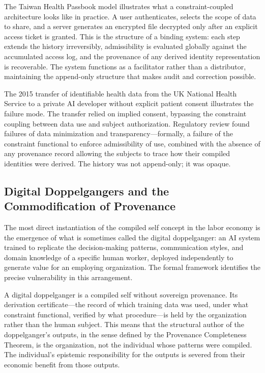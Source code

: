 \documentclass[12pt, a4paper]{article}
\theoremstyle{plain}
\theoremstyle{definition}
\theoremstyle{remark}
\begin{document}
The Taiwan Health Passbook model illustrates what a constraint-coupled architecture looks like in practice. A user authenticates, selects the scope of data to share, and a server generates an encrypted file decrypted only after an explicit access ticket is granted. This is the structure of a binding system: each step extends the history irreversibly, admissibility is evaluated globally against the accumulated access log, and the provenance of any derived identity representation is recoverable. The system functions as a facilitator rather than a distributor, maintaining the append-only structure that makes audit and correction possible.

The 2015 transfer of identifiable health data from the UK National Health Service to a private AI developer without explicit patient consent illustrates the failure mode. The transfer relied on implied consent, bypassing the constraint coupling between data use and subject authorization. Regulatory review found failures of data minimization and transparency---formally, a failure of the constraint functional to enforce admissibility of use, combined with the absence of any provenance record allowing the subjects to trace how their compiled identities were derived. The history was not append-only; it was opaque.

\subsection{Digital Doppelgangers and the Commodification of Provenance}

The most direct instantiation of the compiled self concept in the labor economy is the emergence of what is sometimes called the digital doppelganger: an AI system trained to replicate the decision-making patterns, communication styles, and domain knowledge of a specific human worker, deployed independently to generate value for an employing organization. The formal framework identifies the precise vulnerability in this arrangement.

A digital doppelganger is a compiled self without sovereign provenance. Its derivation certificate---the record of which training data was used, under what constraint functional, verified by what procedure---is held by the organization rather than the human subject. This means that the structural author of the doppelganger's outputs, in the sense defined by the Provenance Completeness Theorem, is the organization, not the individual whose patterns were compiled. The individual's epistemic responsibility for the outputs is severed from their economic benefit from those outputs.
\end{document}
